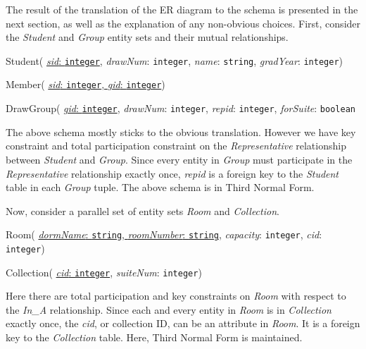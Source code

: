 The result of the translation of the ER diagram to the schema is presented in
the next section, as well as the explanation of any non-obvious choices. First,
consider the \emph{Student} and \emph{Group} entity sets and their mutual
relationships.

\begin{description}
  \item Student(
        \ul{\emph{sid}: \texttt{integer}},
        \emph{drawNum}: \texttt{integer},
        \emph{name}: \texttt{string},
        \emph{gradYear}: \texttt{integer})

  \item Member(
        \ul{\emph{sid}: \texttt{integer},
        \emph{gid}: \texttt{integer}})

  \item DrawGroup(
        \ul{\emph{gid}: \texttt{integer}},
        \emph{drawNum}: \texttt{integer},
        \emph{repid}: \texttt{integer},
        \emph{forSuite}: \texttt{boolean}
\end{description}

The above schema mostly sticks to the obvious translation.  However we have key
constraint and total participation constraint on the \emph{Representative}
relationship between \emph{Student} and \emph{Group}. Since every entity in
\emph {Group} must participate in the \emph{Representative} relationship exactly
once, \emph{repid} is a foreign key to the \emph{Student} table in each
\emph{Group} tuple. The above schema is in Third Normal Form.

Now, consider a parallel set of entity sets \emph{Room} and \emph{Collection}.

\begin{description}
  \item Room(
        \ul{\emph{dormName}: \texttt{string},
        \emph{roomNumber}: \texttt{string}},
        \emph{capacity}: \texttt{integer},
        \emph{cid}: \texttt{integer})

  \item Collection(
        \ul{\emph{cid}: \texttt{integer}},
        \emph{suiteNum}: \texttt{integer})
\end{description}

Here there are total participation and key constraints on \emph{Room} with
respect to the \emph{In\_A} relationship.  Since each and every entity in
\emph{Room} is in \emph{Collection} exactly once, the \emph{cid}, or collection
ID, can be an attribute in \emph{Room}. It is a foreign key to the
\emph{Collection} table. Here, Third Normal Form is maintained.

